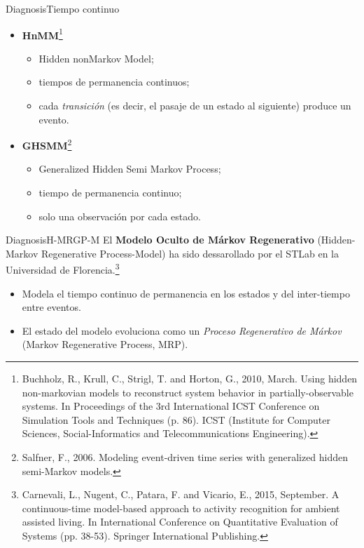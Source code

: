 \documentclass[9pt, handout]{beamer}
\begin{document}
      \begin{frame}{Diagnosis}{Tiempo continuo}
        \begin{itemize}
          \pause
          \item \textbf{HnMM}\footnote{Buchholz, R., Krull, C., Strigl, T. and Horton, G., 2010, March. Using hidden non-markovian models to reconstruct system behavior in partially-observable systems. In Proceedings of the 3rd International ICST Conference on Simulation Tools and Techniques (p. 86). ICST (Institute for Computer Sciences, Social-Informatics and Telecommunications Engineering).}
          \begin{itemize}
            \item Hidden nonMarkov Model;
            \item tiempos de permanencia continuos;
            \item cada \textit{transición} (es decir, el pasaje de un estado al siguiente) produce un evento.
          \end{itemize}
          \pause
          \item \textbf{GHSMM}\footnote{Salfner, F., 2006. Modeling event-driven time series with generalized hidden semi-Markov models.}
          \begin{itemize}
            \item Generalized Hidden Semi Markov Process;
            \item tiempo de permanencia continuo;
            \item solo una observación por cada estado.
          \end{itemize}
        \end{itemize}
      \end{frame}
      
      \begin{frame}{Diagnosis}{H-MRGP-M}
        \pause
        El \textbf{Modelo Oculto de Márkov Regenerativo} (Hidden-Markov Regenerative Process-Model) ha sido dessarollado por el STLab en la Universidad de Florencia.\footnote{Carnevali, L., Nugent, C., Patara, F. and Vicario, E., 2015, September. A continuous-time model-based approach to activity recognition for ambient assisted living. In International Conference on Quantitative Evaluation of Systems (pp. 38-53). Springer International Publishing.}
        
        \pause
        \begin{itemize}
          \item Modela el tiempo continuo de permanencia en los estados y del inter-tiempo entre eventos.
          \pause
          \item El estado del modelo evoluciona como un \textit{Proceso Regenerativo de Márkov} (Markov Regenerative Process, MRP).
        \end{itemize}
      \end{frame}
      
\end{document}

